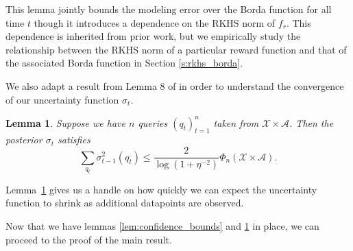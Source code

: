 \documentclass{article} \usepackage{iclr2023_conference,times}
\newcommand{\Contextspace}{\mathcal{X}}
\newcommand{\Actionspace}{\mathcal{A}}
\newtheorem{lemma}[theorem]{Lemma}
\begin{document}
This lemma jointly bounds the modeling error over the Borda function for all time $t$ though it introduces a dependence on the RKHS norm of $f_r$. This dependence is inherited from prior work, but we empirically study the relationship between the RKHS norm of a particular reward function and that of the associated Borda function in Section \ref{s:rkhs_borda}.

We also adapt a result from Lemma 8 of \citet{kandasamy2019multi} in order to understand the convergence of our uncertainty function $\sigma_t$.
\begin{lemma}
    \label{lem:convergence}
    Suppose we have $n$ queries $(q_t)_{t=1}^n$ taken from $\Contextspace \times \Actionspace$. Then the posterior $\sigma_t$ satisfies
    \[\sum_{q_t}\sigma^2_{t-1}(q_t)\leq \frac{2}{\log(1 + \eta^{-2})} \Phi_{n}(\Contextspace\times\Actionspace).\]
\end{lemma}
Lemma~\ref{lem:convergence} gives us a handle on how quickly we can expect the uncertainty function to shrink as additional datapoints are observed.

Now that we have lemmas \ref{lem:confidence_bounds} and \ref{lem:convergence} in place, we can proceed to the proof of the main result.
\end{document}

